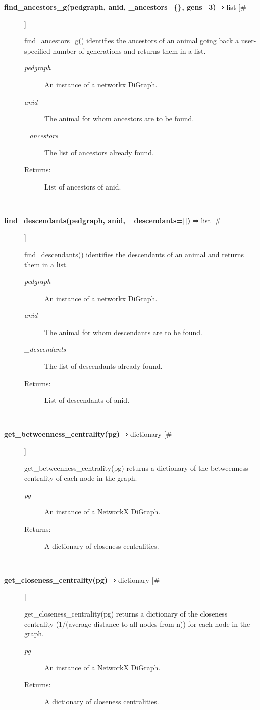 \documentclass{article}
\begin{document}
\begin{description}
\item[\textbf{find\_ancestors\_g(pedgraph, anid, \_ancestors=\{\}, gens=3)} ⇒ list [\#]
]
\par find\_ancestors\_g() identifies the ancestors of an animal going back a user-specified number of generations and returns them in a list.
\begin{description}
\item[\textit{pedgraph}
]
An instance of a networkx DiGraph.
\item[\textit{anid}
]
The animal for whom ancestors are to be found.
\item[\textit{\_ancestors}
]
The list of ancestors already found.
\item[Returns:
]
List of ancestors of anid.
\end{description}\\

\item[\textbf{find\_descendants(pedgraph, anid, \_descendants=[])} ⇒ list [\#]
]
\par find\_descendants() identifies the descendants of an animal and returns them in a list.
\begin{description}
\item[\textit{pedgraph}
]
An instance of a networkx DiGraph.
\item[\textit{anid}
]
The animal for whom descendants are to be found.
\item[\textit{\_descendants}
]
The list of descendants already found.
\item[Returns:
]
List of descendants of anid.
\end{description}\\

\item[\textbf{get\_betweenness\_centrality(pg)} ⇒ dictionary [\#]
]
\par get\_betweenness\_centrality(pg) returns a dictionary of the
betweenness centrality of each node in the graph.
\begin{description}
\item[\textit{pg}
]
An instance of a NetworkX DiGraph.
\item[Returns:
]
A dictionary of closeness centralities.
\end{description}\\

\item[\textbf{get\_closeness\_centrality(pg)} ⇒ dictionary [\#]
]
\par get\_closeness\_centrality(pg) returns a dictionary of the closeness
centrality (1/(average distance to all nodes from n)) for each
node in the graph.
\begin{description}
\item[\textit{pg}
]
An instance of a NetworkX DiGraph.
\item[Returns:
]
A dictionary of closeness centralities.
\end{description}\\


\end{description}
\end{document}
